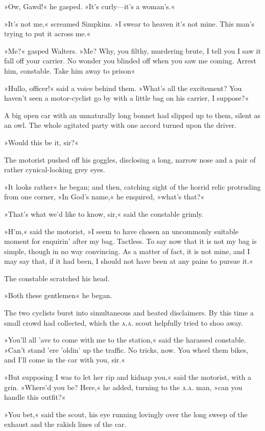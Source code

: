 »Ow, Gawd!« he gasped. »It's curly—it's a woman's.«

»It's not me,« screamed Simpkins. »I swear to heaven it's not mine. This man's trying to put it across me.«

»Me?« gasped Walters. »Me? Why, you filthy, murdering brute, I tell you I saw it fall off your carrier. No wonder you blinded off when you saw me coming. Arrest him, constable. Take him away to prison\longdash«

»Hullo, officer!« said a voice behind them. »What's all the excitement? You haven't seen a motor-cyclist go by with a little bag on his carrier, I suppose?«

A big open car with an unnaturally long bonnet had slipped up to them, silent as an owl. The whole agitated party with one accord turned upon the driver.

»Would this be it, sir?«

The motorist pushed off his goggles, disclosing a long, narrow nose and a pair of rather cynical-looking grey eyes.

»It looks rather\longdash« he began; and then, catching sight of the horrid relic protruding from one corner, »In God's name,« he enquired, »what's that?«

»That's what we'd like to know, sir,« said the constable grimly.

»H'm,« said the motorist, »I seem to have chosen an uncommonly suitable moment for enquirin' after my bag. Tactless. To say now that it is not my bag is simple, though in no way convincing. As a matter of fact, it is not mine, and I may say that, if it had been, I should not have been at any pains to pursue it.«

The constable scratched his head.

»Both these gentlemen\longdash« he began.

The two cyclists burst into simultaneous and heated disclaimers. By this time a small crowd had collected, which the \textsc{a.a.} scout helpfully tried to shoo away.

»You'll all 'ave to come with me to the station,« said the harassed constable. »Can't stand 'ere 'oldin' up the traffic. No tricks, now. You wheel them bikes, and I'll come in the car with you, sir.«

»But supposing I was to let her rip and kidnap you,« said the motorist, with a grin. »Where'd you be? Here,« he added, turning to the \textsc{a.a.} man, »can you handle this outfit?«

»You bet,« said the scout, his eye running lovingly over the long sweep of the exhaust and the rakish lines of the car.

